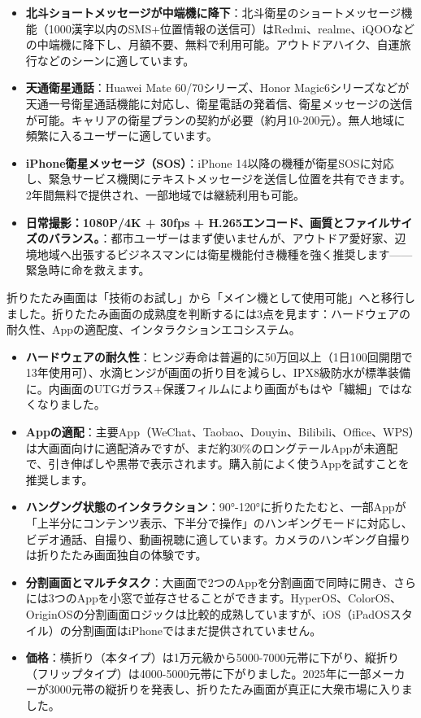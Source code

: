 \begin{itemize}
  \item \textbf{北斗ショートメッセージが中端機に降下}：北斗衛星のショートメッセージ機能（1000漢字以内のSMS+位置情報の送信可）はRedmi、realme、iQOOなどの中端機に降下し、月額不要、無料で利用可能。アウトドアハイク、自運旅行などのシーンに適しています。
  \item \textbf{天通衛星通話}：Huawei Mate 60/70シリーズ、Honor Magic6シリーズなどが天通一号衛星通話機能に対応し、衛星電話の発着信、衛星メッセージの送信が可能。キャリアの衛星プランの契約が必要（約月10-200元）。無人地域に頻繁に入るユーザーに適しています。
  \item \textbf{iPhone衛星メッセージ（SOS）}：iPhone 14以降の機種が衛星SOSに対応し、緊急サービス機関にテキストメッセージを送信し位置を共有できます。2年間無料で提供され、一部地域では継続利用も可能。
  \item \textbf{日常撮影：1080P/4K + 30fps + H.265エンコード、画質とファイルサイズのバランス。}：都市ユーザーはまず使いませんが、アウトドア愛好家、辺境地域へ出張するビジネスマンには衛星機能付き機種を強く推奨します——緊急時に命を救えます。
\end{itemize}


折りたたみ画面は「技術のお試し」から「メイン機として使用可能」へと移行しました。折りたたみ画面の成熟度を判断するには3点を見ます：ハードウェアの耐久性、Appの適配度、インタラクションエコシステム。

\begin{itemize}
  \item \textbf{ハードウェアの耐久性}：ヒンジ寿命は普遍的に50万回以上（1日100回開閉で13年使用可）、水滴ヒンジが画面の折り目を減らし、IPX8級防水が標準装備に。内画面のUTGガラス+保護フィルムにより画面がもはや「繊細」ではなくなりました。
  \item \textbf{Appの適配}：主要App（WeChat、Taobao、Douyin、Bilibili、Office、WPS）は大画面向けに適配済みですが、まだ約30\%のロングテールAppが未適配で、引き伸ばしや黒帯で表示されます。購入前によく使うAppを試すことを推奨します。
  \item \textbf{ハングング状態のインタラクション}：90°-120°に折りたたむと、一部Appが「上半分にコンテンツ表示、下半分で操作」のハンギングモードに対応し、ビデオ通話、自撮り、動画視聴に適しています。カメラのハンギング自撮りは折りたたみ画面独自の体験です。
  \item \textbf{分割画面とマルチタスク}：大画面で2つのAppを分割画面で同時に開き、さらには3つのAppを小窓で並存させることができます。HyperOS、ColorOS、OriginOSの分割画面ロジックは比較的成熟していますが、iOS（iPadOSスタイル）の分割画面はiPhoneではまだ提供されていません。
  \item \textbf{価格}：横折り（本タイプ）は1万元級から5000-7000元帯に下がり、縦折り（フリップタイプ）は4000-5000元帯に下がりました。2025年に一部メーカーが3000元帯の縦折りを発表し、折りたたみ画面が真正に大衆市場に入りました。
\end{itemize}

